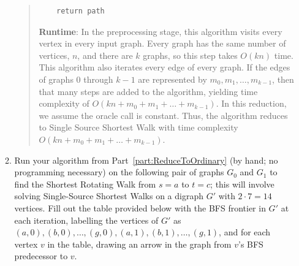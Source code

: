 \documentclass[11pt]{article}
\begin{document}
\begin{enumerate}
\begin{enumerate}
\begin{quote}
\begin{verbatim}
    return path
\end{verbatim}

            \vspace{2em}
            \textbf{Runtime}: \newline
            In the preprocessing stage, this algorithm visits every vertex in every input graph. 
            Every graph has the same number of vertices, $n$, and there are $k$ graphs, so this step takes $O(kn)$ time. 
            This algorithm also iterates every edge of every graph. If the edges of graphs $0$ through $k - 1$ are represented by $m_0, m_1, \dots, m_{k - 1}$, then that many steps are added to the algorithm, yielding time complexity of $O(kn + m_0 + m_1 + \dots + m_{k - 1})$. 
            In this reduction, we assume the oracle call is constant. Thus, the algorithm reduces to Single Source Shortest Walk with time complexity $O(kn + m_0 + m_1 + \dots + m_{k - 1})$.      
        \end{quote}
        \vspace{1em}
        
        
        \item \label{part:BFS} 
        Run your algorithm from Part~\ref{part:ReduceToOrdinary} (by hand; no programming necessary) on the following pair of graphs $G_0$ and $G_1$ to find the Shortest Rotating Walk from $s=a$ to $t=c$; this will involve solving Single-Source Shortest Walks on a digraph $G'$ with $2\cdot 7=14$ vertices. Fill out the table provided below with the BFS frontier in $G'$ at each iteration, labelling the vertices of $G'$ as $(a, 0),(b, 0),\ldots,(g,0),(a,1),(b,1),\ldots,(g,1)$, and for each vertex $v$ in the table, drawing an arrow in the graph from $v$'s BFS predecessor to $v$. 


\end{enumerate}
\end{enumerate}
\end{document}
